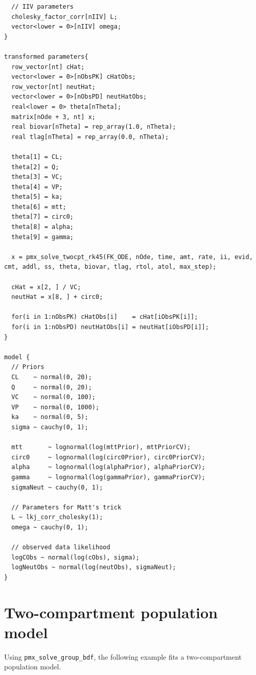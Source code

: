 \documentclass[10pt, reqno, oneside]{amsbook}
\numberwithin{equation}{chapter}
\numberwithin{figure}{chapter}
\numberwithin{table}{chapter}
\theoremstyle{remark}
\begin{document}
\begin{verbatim}
  // IIV parameters
  cholesky_factor_corr[nIIV] L;
  vector<lower = 0>[nIIV] omega;
}

transformed parameters{
  row_vector[nt] cHat;
  vector<lower = 0>[nObsPK] cHatObs;
  row_vector[nt] neutHat;
  vector<lower = 0>[nObsPD] neutHatObs;
  real<lower = 0> theta[nTheta];
  matrix[nOde + 3, nt] x;
  real biovar[nTheta] = rep_array(1.0, nTheta);
  real tlag[nTheta] = rep_array(0.0, nTheta);

  theta[1] = CL;
  theta[2] = Q;
  theta[3] = VC;
  theta[4] = VP;
  theta[5] = ka;
  theta[6] = mtt;
  theta[7] = circ0;
  theta[8] = alpha;
  theta[9] = gamma;

  x = pmx_solve_twocpt_rk45(FK_ODE, nOde, time, amt, rate, ii, evid, cmt, addl, ss, theta, biovar, tlag, rtol, atol, max_step);

  cHat = x[2, ] / VC;
  neutHat = x[8, ] + circ0;

  for(i in 1:nObsPK) cHatObs[i]    = cHat[iObsPK[i]];
  for(i in 1:nObsPD) neutHatObs[i] = neutHat[iObsPD[i]];
}

model {
  // Priors
  CL    ~ normal(0, 20);
  Q     ~ normal(0, 20);
  VC    ~ normal(0, 100);
  VP    ~ normal(0, 1000);
  ka    ~ normal(0, 5);
  sigma ~ cauchy(0, 1);

  mtt       ~ lognormal(log(mttPrior), mttPriorCV);
  circ0     ~ lognormal(log(circ0Prior), circ0PriorCV);
  alpha     ~ lognormal(log(alphaPrior), alphaPriorCV);
  gamma     ~ lognormal(log(gammaPrior), gammaPriorCV);
  sigmaNeut ~ cauchy(0, 1);

  // Parameters for Matt's trick
  L ~ lkj_corr_cholesky(1);
  omega ~ cauchy(0, 1);

  // observed data likelihood
  logCObs ~ normal(log(cObs), sigma);
  logNeutObs ~ normal(log(neutObs), sigmaNeut);
}
\end{verbatim}

\section{Two-compartment population model}
\label{sec:org1c4e6b8}
Using \texttt{pmx\_solve\_group\_bdf}, the following example fits a
two-compartment population model.
\end{document}
